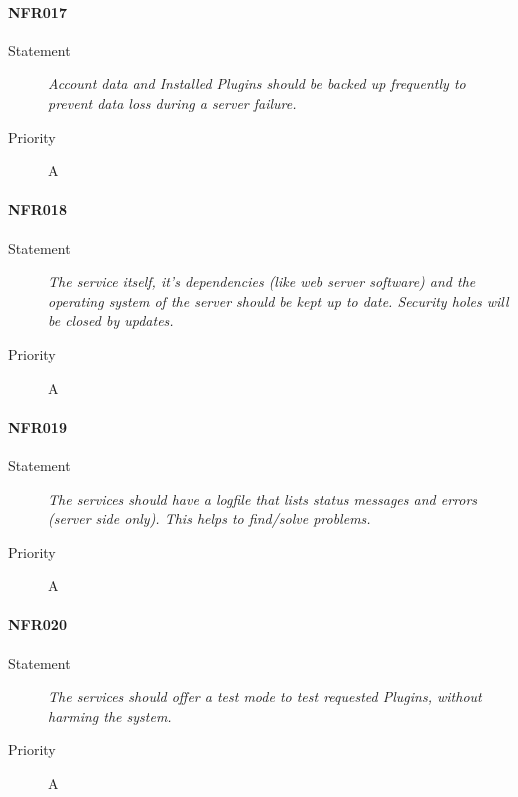 \paragraph{NFR017}
\begin{description}
  \item [Statement] \textit{\gls{Account} data and \gls{Installed Plugins} should be backed up frequently to prevent data loss during a server failure.}
  \item [Priority] A
\end{description}

\paragraph{NFR018}
\begin{description}
  \item [Statement] \textit{The service itself, it's dependencies (like web server software) and the operating system of the server should be kept up to date. \gls{Security hole}s will be closed by updates.}
  \item [Priority] A
\end{description}

\paragraph{NFR019}
\begin{description}
  \item [Statement] \textit{The services should have a logfile that lists status messages and errors (server side only). This helps to find/solve problems.}
  \item [Priority] A
\end{description}

\paragraph{NFR020}
\begin{description}
  \item [Statement] \textit{The services should offer a test mode to test requested \gls{Plugins}, without harming the system.}
  \item [Priority] A
\end{description}


